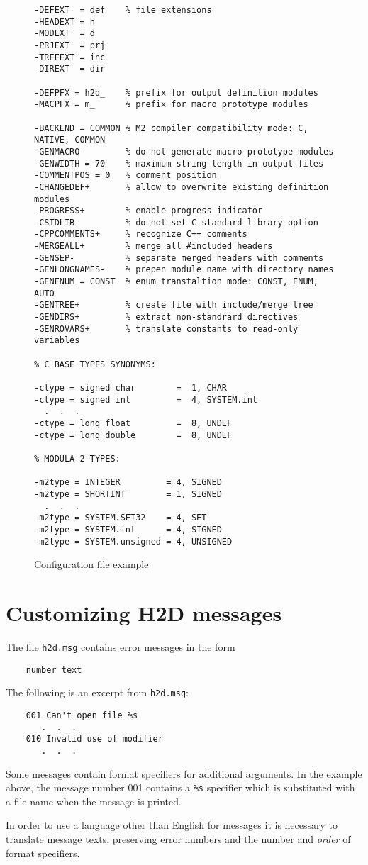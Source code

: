 \begin{figure}[bht]
{\ifonline\else\small\fi
\begin{verbatim}
-DEFEXT  = def    % file extensions
-HEADEXT = h
-MODEXT  = d
-PRJEXT  = prj
-TREEEXT = inc
-DIREXT  = dir

-DEFPFX = h2d_    % prefix for output definition modules
-MACPFX = m_      % prefix for macro prototype modules

-BACKEND = COMMON % M2 compiler compatibility mode: C, NATIVE, COMMON
-GENMACRO-        % do not generate macro prototype modules
-GENWIDTH = 70    % maximum string length in output files
-COMMENTPOS = 0   % comment position
-CHANGEDEF+       % allow to overwrite existing definition modules
-PROGRESS+        % enable progress indicator
-CSTDLIB-         % do not set C standard library option
-CPPCOMMENTS+     % recognize C++ comments
-MERGEALL+        % merge all #included headers
-GENSEP-          % separate merged headers with comments
-GENLONGNAMES-    % prepen module name with directory names
-GENENUM = CONST  % enum transtaltion mode: CONST, ENUM, AUTO
-GENTREE+         % create file with include/merge tree
-GENDIRS+         % extract non-standrard directives
-GENROVARS+       % translate constants to read-only variables

% C BASE TYPES SYNONYMS:

-ctype = signed char        =  1, CHAR
-ctype = signed int         =  4, SYSTEM.int
  .  .  .
-ctype = long float         =  8, UNDEF
-ctype = long double        =  8, UNDEF

% MODULA-2 TYPES:

-m2type = INTEGER         = 4, SIGNED
-m2type = SHORTINT        = 1, SIGNED
  .  .  .
-m2type = SYSTEM.SET32    = 4, SET
-m2type = SYSTEM.int      = 4, SIGNED
-m2type = SYSTEM.unsigned = 4, UNSIGNED
\end{verbatim}
} %
\caption{Configuration file example}
\label{config:cfg:example}
\end{figure}

\section{Customizing H2D messages}
\label{config:msg}

The file {\tt h2d.msg} contains error messages in the form

\verb'    number text'

The following is an excerpt from {\tt h2d.msg}:

\begin{verbatim}
    001 Can't open file %s
       .  .  .
    010 Invalid use of modifier
       .  .  .
\end{verbatim}

Some messages contain format specifiers for additional arguments. In
the example above, the message number 001 contains a {\tt \%s} specifier
which is substituted with a file name when the message is printed.

In order to use a language other than English for messages it is
necessary to translate message texts, preserving error
numbers and the number and {\em order} of format specifiers.

